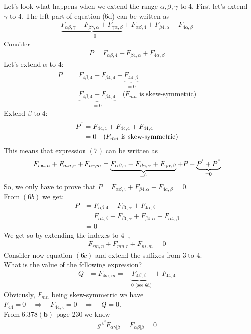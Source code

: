 Let's look what happens when we extend the range  $\alpha,\beta,\gamma$ to $4$. First let's extend  $\gamma$ to $4$. The left part of equation (6d) can be written as 
\begin{align}
\underbrace{F_{\alpha\beta,\gamma}+F_{\beta\gamma,\alpha}+F_{\gamma\alpha,\beta}}_{=0}+ F_{\alpha\beta,4}+F_{\beta4,\alpha}+F_{4\alpha,\beta}
\end{align}
Consider 
\begin{align}
P= F_{\alpha\beta,4}+F_{\beta4,\alpha}+F_{4\alpha,\beta}
\end{align}
Let's extend $\alpha$ to $4$:
\begin{align}
P^{'}&= F_{4\beta,4}+F_{\beta4,4}+\underbrace{F_{44,\beta}}_{=0}\\
&= \underbrace{F_{4\beta,4}+F_{\beta4,4}}_{=0}\quad \text{(}F_{mn} \text{ is skew-symmetric)}
\end{align}
Extend $\beta$ to $4$:
\begin{align}
P^{"}&= F_{44,4}+F_{44,4}+F_{44,4}\\
&=0\quad \text{(}F_{mn} \text{ is skew-symmetric)}
\end{align}
This means that expression $(7)$ can be written as 
$$F_{rm,n}+F_{mn,r}+F_{nr,m}=\underbrace{F_{\alpha\beta,\gamma}+F_{\beta\gamma,\alpha}+F_{\gamma\alpha,\beta}}_{=0}+P+\underbrace{P^{'}+P^{"} }_{=0}$$
So, we only have to prove that $P= F_{\alpha\beta,4}+F_{\beta4,\alpha}+F_{4\alpha,\beta}=0$.\\
From $(6b)$ we get:
\begin{align}
P&= F_{\alpha\beta,4}+F_{\beta4,\alpha}+F_{4\alpha,\beta}\\
&= F_{\alpha4,\beta}-F_{\beta4,\alpha}+F_{\beta4,\alpha}-F_{\alpha4,\beta}\\
&=0
\end{align}
We get so by extending the indexes to $4$: ,
\begin{align}
F_{rm,n}+F_{mn,r}+F_{nr,m}=0
\end{align}
Consider now equation $(6c)$ and extend the suffixes from $3$ to $4$.\\
What is the value of the following expression?
\begin{align}
Q&=F_{4m,m}=\underbrace{F_{4\beta,\beta} }_{=0\text{ (see 6d) }}+ F_{44,4}
\end{align}
Obviously, $F_{mn}$ being skew-symmetric we have $F_{44}=0\quad\Rightarrow\quad F_{44,4}=0 \quad \Rightarrow\quad Q=0$.\\
From $\mathbf{6.378(b)}$ page 230 we know
\begin{align}
g^{\gamma\beta}F_{\alpha\gamma|\beta}=F_{\alpha\beta|\beta}=0
\end{align}
